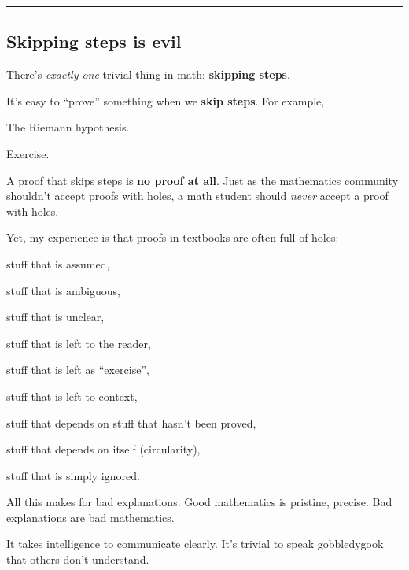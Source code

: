 \vs\hrule\vskip1pt
\subsection{\bf Skipping steps is evil}

There's {\it exactly one} trivial thing in math: {\bf skipping steps}. \par

\vs
It's easy to ``prove'' something when we {\bf skip steps}. For example, \par

\vs
\theorem The Riemann hypothesis. \par
\proof   Exercise. \par

\vs
A proof that skips steps is {\bf no proof at all}.
Just as the mathematics community shouldn't accept proofs with holes, a math student should {\it never} accept a proof with holes.
\par

\vs
Yet, my experience is that proofs in textbooks are often full of holes: \par
  \hs stuff that is assumed, \par
  \hs stuff that is ambiguous, \par
  \hs stuff that is unclear, \par
  \hs stuff that is left to the reader, \par
  \hs stuff that is left as ``exercise'', \par
  \hs stuff that is left to context, \par
  \hs stuff that depends on stuff that hasn't been proved, \par
  \hs stuff that depends on itself (circularity), \par
  \hs stuff that is simply ignored. \par
All this makes for bad explanations. Good mathematics is pristine, precise. Bad explanations are bad mathematics.

\vs
It takes intelligence to communicate clearly. It's trivial to speak gobbledygook that others don't understand. \par

